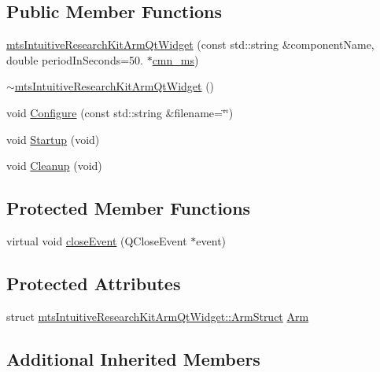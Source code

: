 \subsection*{Public Member Functions}
\begin{DoxyCompactItemize}
\item 
\hyperlink{classmts_intuitive_research_kit_arm_qt_widget_ad60b765537cb643d50744018146e5edd}{mts\+Intuitive\+Research\+Kit\+Arm\+Qt\+Widget} (const std\+::string \&component\+Name, double period\+In\+Seconds=50. $\ast$\hyperlink{cmn_units_8h_aaf4d3f2fafb9b4a95606544b9d876b4a}{cmn\+\_\+ms})
\item 
\hyperlink{classmts_intuitive_research_kit_arm_qt_widget_a858fa4fe6f05dfbfd2e022db969365ff}{$\sim$mts\+Intuitive\+Research\+Kit\+Arm\+Qt\+Widget} ()
\item 
void \hyperlink{classmts_intuitive_research_kit_arm_qt_widget_a6be920b1878620b718a3deb3e24d9260}{Configure} (const std\+::string \&filename=\char`\"{}\char`\"{})
\item 
void \hyperlink{classmts_intuitive_research_kit_arm_qt_widget_ad3fe47e3be5af5ffcefb856804c8578c}{Startup} (void)
\item 
void \hyperlink{classmts_intuitive_research_kit_arm_qt_widget_ae63cd93bba44f06e7d611e2b9a5dd8f7}{Cleanup} (void)
\end{DoxyCompactItemize}
\subsection*{Protected Member Functions}
\begin{DoxyCompactItemize}
\item 
virtual void \hyperlink{classmts_intuitive_research_kit_arm_qt_widget_a647594fbe97d37c4777efb12d6b8a816}{close\+Event} (Q\+Close\+Event $\ast$event)
\end{DoxyCompactItemize}
\subsection*{Protected Attributes}
\begin{DoxyCompactItemize}
\item 
struct \hyperlink{structmts_intuitive_research_kit_arm_qt_widget_1_1_arm_struct}{mts\+Intuitive\+Research\+Kit\+Arm\+Qt\+Widget\+::\+Arm\+Struct} \hyperlink{classmts_intuitive_research_kit_arm_qt_widget_a8827ac29528271bc9af49e3d767d0a31}{Arm}
\end{DoxyCompactItemize}
\subsection*{Additional Inherited Members}


